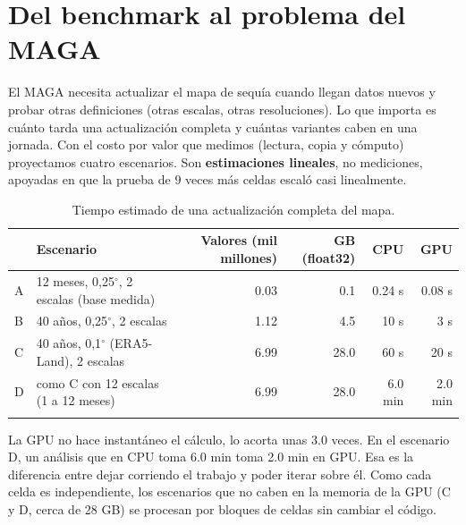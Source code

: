 \documentclass[10pt]{article}
\begin{document}
\section{Del benchmark al problema del MAGA}
El MAGA necesita actualizar el mapa de sequ\'ia cuando llegan datos nuevos y probar otras definiciones (otras escalas, otras resoluciones). Lo que importa es cu\'anto tarda una actualizaci\'on completa y cu\'antas variantes caben en una jornada. Con el costo por valor que medimos (lectura, copia y c\'omputo) proyectamos cuatro escenarios. Son \textbf{estimaciones lineales}, no mediciones, apoyadas en que la prueba de 9 veces m\'as celdas escal\'o casi linealmente.
\begin{table}[H]\centering\small
\begin{tabular}{llrrrr}\toprule & Escenario & Valores (mil millones) & GB (float32) & CPU & GPU \\\midrule
A & 12 meses, 0,25$^\circ$, 2 escalas (base medida) & 0.03 & 0.1 & 0.24 s & 0.08 s \\
B & 40 a\~nos, 0,25$^\circ$, 2 escalas & 1.12 & 4.5 & 10 s & 3 s \\
C & 40 a\~nos, 0,1$^\circ$ (ERA5-Land), 2 escalas & 6.99 & 28.0 & 60 s & 20 s \\
D & como C con 12 escalas (1 a 12 meses) & 6.99 & 28.0 & 6.0 min & 2.0 min \\
\\\bottomrule\end{tabular}\caption{Tiempo estimado de una actualizaci\'on completa del mapa.}\end{table}
La GPU no hace instant\'aneo el c\'alculo, lo acorta unas 3.0 veces. En el escenario D, un an\'alisis que en CPU toma 6.0 min toma 2.0 min en GPU. Esa es la diferencia entre dejar corriendo el trabajo y poder iterar sobre \'el. Como cada celda es independiente, los escenarios que no caben en la memoria de la GPU (C y D, cerca de 28 GB) se procesan por bloques de celdas sin cambiar el c\'odigo.
\end{document}

